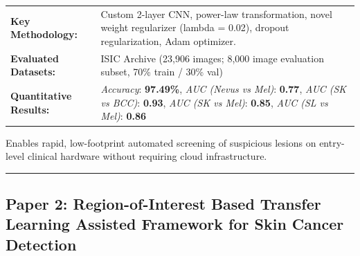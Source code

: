 \documentclass[10pt,a4paper]{article}
\begin{document}
\vspace{4pt}
\begin{tabularx}{\linewidth}{p{3.2cm}X}
\toprule
\textbf{Key Methodology:} & Custom 2-layer CNN, power-law transformation, novel weight regularizer (lambda = 0.02), dropout regularization, Adam optimizer. \\
\textbf{Evaluated Datasets:} & ISIC Archive (23,906 images; 8,000 image evaluation subset, 70\% train / 30\% val) \\
\textbf{Quantitative Results:} & \textit{Accuracy}: \textbf{97.49\%}, \textit{AUC (Nevus vs Mel)}: \textbf{0.77}, \textit{AUC (SK vs BCC)}: \textbf{0.93}, \textit{AUC (SK vs Mel)}: \textbf{0.85}, \textit{AUC (SL vs Mel)}: \textbf{0.86} \\
\bottomrule
\end{tabularx}
\vspace{4pt}
\begin{tcolorbox}[utilitybox,title=Clinical Utility and Real-World Impact]
Enables rapid, low-footprint automated screening of suspicious lesions on entry-level clinical hardware without requiring cloud infrastructure.
\end{tcolorbox}
\vspace{12pt}
\hrule
\vspace{12pt}
\subsection*{Paper 2: Region-of-Interest Based Transfer Learning Assisted Framework for Skin Cancer Detection}
\end{document}

